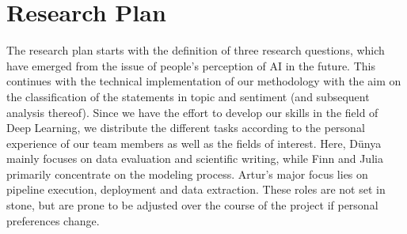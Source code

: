 \documentclass[11pt]{article}
\begin{document}
\section{Research Plan}
The research plan starts with the definition of three research questions, which have emerged from the issue of people’s perception of AI in the future.
This continues with the technical implementation of our methodology with the aim on the classification of the statements in topic and sentiment (and subsequent analysis thereof).
Since we have the effort to develop our skills in the field of Deep Learning, we distribute the different tasks according to the personal experience of our team members as well as the fields of interest.
Here, Dünya mainly focuses on data evaluation and scientific writing, while Finn and Julia primarily concentrate on the modeling process.
Artur's major focus lies on pipeline execution, deployment and data extraction.
These roles are not set in stone, but are prone to be adjusted over the course of the project if personal preferences change.
\end{document}
